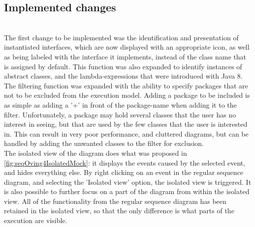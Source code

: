 \subsection{Implemented changes}\label{jiveImpl}%
~\\

The first change to be implemented was the identification and presentation of instantiated interfaces, which are now displayed with an appropriate icon, as well as being labeled with the interface it implements, instead of the class name that is assigned by default.
This function was also expanded to identify instances of abstract classes, and the lambda-expressions that were introduced with Java 8.
~\\

The filtering function was expanded with the ability to specify packages that are not to be excluded from the execution model.
Adding a package to be included is as simple as adding a '+' in front of the package-name when adding it to the filter.
Unfortunately, a package may hold several classes that the user has no interest in seeing, but that are used by the few classes that the user is interested in.
This can result in very poor performance, and cluttered diagrams, but can be handled by adding the unwanted classes to the filter for exclusion.
~\\

The isolated view of the diagram does what was proposed in \autoref{fig:seqOving4IsolatedMock}: it displays the events caused by the selected event, and hides everything else.
By right clicking on an event in the regular sequence diagram, and selecting the 'Isolated view' option, the isolated view is triggered.
It is also possible to further focus on a part of the diagram from within the isolated view.
All of the functionality from the regular sequence diagram has been retained in the isolated view, so that the only difference is what parts of the execution are visible.
~\\
 
